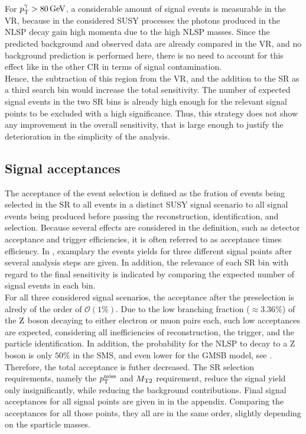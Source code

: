 For $p_{\mathrm{T}}^{\gamma} >80\,\text{Ge\hspace{-.08em}V}$, a considerable amount of signal events is measurable in the VR, because in the considered SUSY processes the photons produced in the NLSP decay gain high momenta due to the high NLSP masses. Since the predicted background and observed data are already compared in the VR, and no background prediction is performed here, there is no need to account for this effect like in the other CR in terms of signal contamination.\\
Hence, the subtraction of this region from the VR, and the addition to the SR as a third search bin would increase the total sensitivity. The number of expected signal events in the two SR bins is already high enough for the relevant signal points to be excluded with a high significance. Thus, this strategy does not show any improvement in the overall sensitivity, that is large enough to justify the deterioration in the simplicity of the analysis.


\subsection*{Signal acceptances}
The acceptance of the event selection is defined as the fration of events being selected in the SR to all events in a distinct SUSY signal scenario to all signal events being produced before passing the reconstruction, identification, and selection. Because several effects are considered in the definition, such as detector acceptance and trigger efficiencies, it is often referred to as acceptance times efficiency. In , examplary the events yields for three different signal points after several analysis steps are given. In addition, the relevance of each SR bin with regard to the final sensitivity is indicated by comparing the expected number of signal events in each bin.\\
For all three considered signal scenarios, the acceptance after the preselection is alredy of the order of $\mathcal{O}(1\%)$. Due to the low branching fraction ($\approx3.36\%$) of the $\mathrm{Z}$ boson decaying to either electron or muon pairs each, such low acceptances are expected, considering all inefficiencies of reconstruction, the trigger, and the particle identification. In addition, the probability for the NLSP to decay to a Z boson is only $50\%$ in the SMS, and even lower for the GMSB model, see . Therefore, the total acceptance is futher decreased. The SR selection requirements, namely the $p_{\mathrm{T}}^\text{miss}$ and $M_{\mathrm{T2}}$ requirement, reduce the signal yield only insignificantly, while reducing the background contributions. Final signal acceptances for all signal points are given in  in the appendix. Comparing the acceptances for all those points, they all are in the same order, slightly depending on the sparticle masses.

